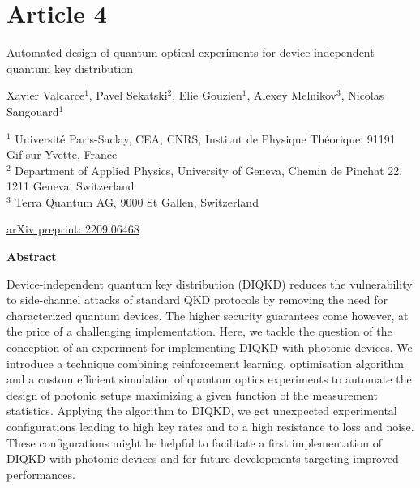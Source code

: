 \chapter*{Article 4}

\centering
\textrm{\LARGE Automated design of quantum optical experiments for device-independent quantum key distribution}

\vspace{2cm}

\normalsize
Xavier Valcarce$^{1}$, Pavel Sekatski$^{2}$, Elie Gouzien$^{1}$, Alexey Melnikov$^{3}$, Nicolas Sangouard$^{1}$
\bigbreak

{\footnotesize
	$^1$ Université Paris-Saclay, CEA, CNRS, Institut de Physique Théorique, 91191 Gif-sur-Yvette, France \\
	$^2$ Department of Applied Physics, University of Geneva, Chemin de Pinchat 22, 1211 Geneva, Switzerland \\
	$^3$ Terra Quantum AG, 9000 St Gallen, Switzerland
}

\raggedright
\bigbreak
\faLink \quad \href{https://arxiv.org/abs/2209.06468}{arXiv preprint: 2209.06468}
\vspace{1cm}

\centering
\textbf{Abstract}
\bigbreak

Device-independent quantum key distribution (DIQKD) reduces the vulnerability to side-channel attacks of standard QKD protocols by removing the need for characterized quantum devices.
The higher security guarantees come however, at the price of a challenging implementation.
Here, we tackle the question of the conception of an experiment for implementing DIQKD with photonic devices.
We introduce a technique combining reinforcement learning, optimisation algorithm and a custom efficient simulation of quantum optics experiments to automate the design of photonic setups maximizing a given function of the measurement statistics.
Applying the algorithm to DIQKD, we get unexpected experimental configurations leading to high key rates and to a high resistance to loss and noise.
These configurations might be helpful to facilitate a first implementation of DIQKD with photonic devices and for future developments targeting improved performances.
